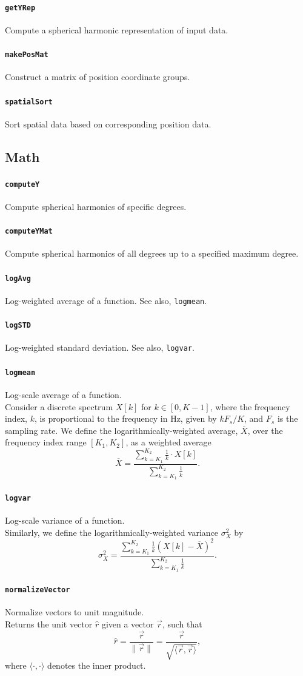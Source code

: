 \documentclass[11pt, oneside]{article}
\newcommand{\function}[1]{\paragraph*{\texttt{#1}}}
\begin{document}
\function{getYRep} Compute a spherical harmonic representation of input data. \\

\function{makePosMat} Construct a matrix of position coordinate groups. \\

\function{spatialSort} Sort spatial data based on corresponding position data. \\

\subsection{Math}

\function{computeY} Compute spherical harmonics of specific degrees. \\

\function{computeYMat} Compute spherical harmonics of all degrees up to a specified maximum degree. \\

\function{logAvg} Log-weighted average of a function.
See also, \texttt{logmean}. \\

\function{logSTD} Log-weighted standard deviation.
See also, \texttt{logvar}. \\

\function{logmean} Log-scale average of a function. \\
Consider a discrete spectrum $X[k]$ for $k \in [0, K-1]$, where the frequency index, $k$, is proportional to the frequency in Hz, given by $k F_s/K$, and $F_s$ is the sampling rate.
We define the logarithmically-weighted average, $\overline{X}$, over the frequency index range $[K_1, K_2]$, as a weighted average
\begin{equation}\label{eq:logmean}
\overline{X} = \frac{\displaystyle \sum_{k=K_1}^{K_2} \frac{1}{k} \cdot X[k]}{\displaystyle \sum_{k=K_1}^{K_2} \frac{1}{k}}.
\end{equation}

\function{logvar} Log-scale variance of a function. \\
Similarly, we define the logarithmically-weighted variance $\sigma_X^2$ by
\begin{equation}\label{eq:logvar}
\sigma_X^2 = \frac{\displaystyle \sum_{k=K_1}^{K_2} \frac{1}{k} \left( X[k] - \overline{X} \right)^2}{\displaystyle \sum_{k=K_1}^{K_2} \frac{1}{k}}.
\end{equation}

\function{normalizeVector} Normalize vectors to unit magnitude. \\
Returns the unit vector $\hat{r}$ given a vector $\vec{r}$, such that
\begin{equation}
\hat{r} = \frac{\vec{r}}{\|\vec{r}\|} = \frac{\vec{r}}{\sqrt{\langle \vec{r}, \vec{r} \rangle}},
\end{equation}
where $\langle \cdot, \cdot \rangle$ denotes the inner product.
\end{document}
